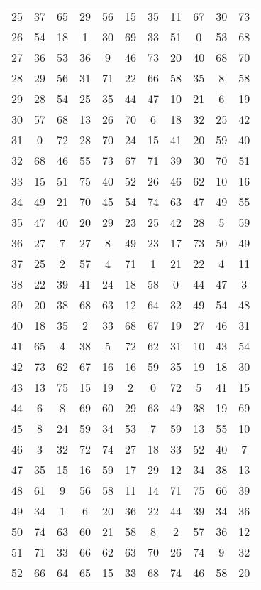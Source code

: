 \begin{table}
\begin{tabular}{c c c c c c c c c c c }
25 & 37 & 65 & 29 & 56 & 15 & 35 & 11 & 67 & 30 & 73 \\
26 & 54 & 18 & 1 & 30 & 69 & 33 & 51 & 0 & 53 & 68 \\
27 & 36 & 53 & 36 & 9 & 46 & 73 & 20 & 40 & 68 & 70 \\
28 & 29 & 56 & 31 & 71 & 22 & 66 & 58 & 35 & 8 & 58 \\
29 & 28 & 54 & 25 & 35 & 44 & 47 & 10 & 21 & 6 & 19 \\
30 & 57 & 68 & 13 & 26 & 70 & 6 & 18 & 32 & 25 & 42 \\
31 & 0 & 72 & 28 & 70 & 24 & 15 & 41 & 20 & 59 & 40 \\
32 & 68 & 46 & 55 & 73 & 67 & 71 & 39 & 30 & 70 & 51 \\
33 & 15 & 51 & 75 & 40 & 52 & 26 & 46 & 62 & 10 & 16 \\
34 & 49 & 21 & 70 & 45 & 54 & 74 & 63 & 47 & 49 & 55 \\
35 & 47 & 40 & 20 & 29 & 23 & 25 & 42 & 28 & 5 & 59 \\
36 & 27 & 7 & 27 & 8 & 49 & 23 & 17 & 73 & 50 & 49 \\
37 & 25 & 2 & 57 & 4 & 71 & 1 & 21 & 22 & 4 & 11 \\
38 & 22 & 39 & 41 & 24 & 18 & 58 & 0 & 44 & 47 & 3 \\
39 & 20 & 38 & 68 & 63 & 12 & 64 & 32 & 49 & 54 & 48 \\
40 & 18 & 35 & 2 & 33 & 68 & 67 & 19 & 27 & 46 & 31 \\
41 & 65 & 4 & 38 & 5 & 72 & 62 & 31 & 10 & 43 & 54 \\
42 & 73 & 62 & 67 & 16 & 16 & 59 & 35 & 19 & 18 & 30 \\
43 & 13 & 75 & 15 & 19 & 2 & 0 & 72 & 5 & 41 & 15 \\
44 & 6 & 8 & 69 & 60 & 29 & 63 & 49 & 38 & 19 & 69 \\
45 & 8 & 24 & 59 & 34 & 53 & 7 & 59 & 13 & 55 & 10 \\
46 & 3 & 32 & 72 & 74 & 27 & 18 & 33 & 52 & 40 & 7 \\
47 & 35 & 15 & 16 & 59 & 17 & 29 & 12 & 34 & 38 & 13 \\
48 & 61 & 9 & 56 & 58 & 11 & 14 & 71 & 75 & 66 & 39 \\
49 & 34 & 1 & 6 & 20 & 36 & 22 & 44 & 39 & 34 & 36 \\
50 & 74 & 63 & 60 & 21 & 58 & 8 & 2 & 57 & 36 & 12 \\
51 & 71 & 33 & 66 & 62 & 63 & 70 & 26 & 74 & 9 & 32 \\
52 & 66 & 64 & 65 & 15 & 33 & 68 & 74 & 46 & 58 & 20 \\

\end{tabular}
\end{table}
